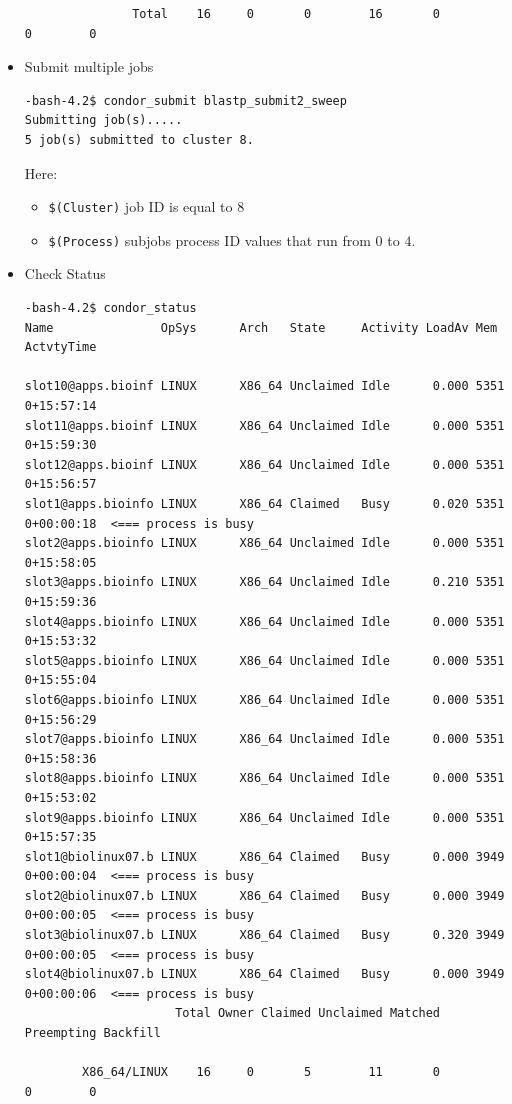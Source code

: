 \documentclass{article}
\begin{document}
\begin{itemize}
\begin{verbatim}
               Total    16     0       0        16       0          0        0
\end{verbatim}
\normalsize
\item Submit multiple jobs
\scriptsize
\begin{verbatim}
-bash-4.2$ condor_submit blastp_submit2_sweep 
Submitting job(s).....
5 job(s) submitted to cluster 8.
\end{verbatim}
Here: 
\begin{itemize}
 \item \verb+$(Cluster)+ job ID is equal to $8$ 
 \item \verb+$(Process)+ subjobs process ID values that run from $0$ to $4$. 
\end{itemize}
\normalsize
\item Check Status
\scriptsize
\begin{verbatim}              
-bash-4.2$ condor_status
Name               OpSys      Arch   State     Activity LoadAv Mem   ActvtyTime

slot10@apps.bioinf LINUX      X86_64 Unclaimed Idle      0.000 5351  0+15:57:14
slot11@apps.bioinf LINUX      X86_64 Unclaimed Idle      0.000 5351  0+15:59:30
slot12@apps.bioinf LINUX      X86_64 Unclaimed Idle      0.000 5351  0+15:56:57
slot1@apps.bioinfo LINUX      X86_64 Claimed   Busy      0.020 5351  0+00:00:18  <=== process is busy
slot2@apps.bioinfo LINUX      X86_64 Unclaimed Idle      0.000 5351  0+15:58:05
slot3@apps.bioinfo LINUX      X86_64 Unclaimed Idle      0.210 5351  0+15:59:36
slot4@apps.bioinfo LINUX      X86_64 Unclaimed Idle      0.000 5351  0+15:53:32
slot5@apps.bioinfo LINUX      X86_64 Unclaimed Idle      0.000 5351  0+15:55:04
slot6@apps.bioinfo LINUX      X86_64 Unclaimed Idle      0.000 5351  0+15:56:29
slot7@apps.bioinfo LINUX      X86_64 Unclaimed Idle      0.000 5351  0+15:58:36
slot8@apps.bioinfo LINUX      X86_64 Unclaimed Idle      0.000 5351  0+15:53:02
slot9@apps.bioinfo LINUX      X86_64 Unclaimed Idle      0.000 5351  0+15:57:35
slot1@biolinux07.b LINUX      X86_64 Claimed   Busy      0.000 3949  0+00:00:04  <=== process is busy
slot2@biolinux07.b LINUX      X86_64 Claimed   Busy      0.000 3949  0+00:00:05  <=== process is busy
slot3@biolinux07.b LINUX      X86_64 Claimed   Busy      0.320 3949  0+00:00:05  <=== process is busy
slot4@biolinux07.b LINUX      X86_64 Claimed   Busy      0.000 3949  0+00:00:06  <=== process is busy
                     Total Owner Claimed Unclaimed Matched Preempting Backfill

        X86_64/LINUX    16     0       5        11       0          0        0


\end{verbatim}
\end{itemize}
\end{document}
